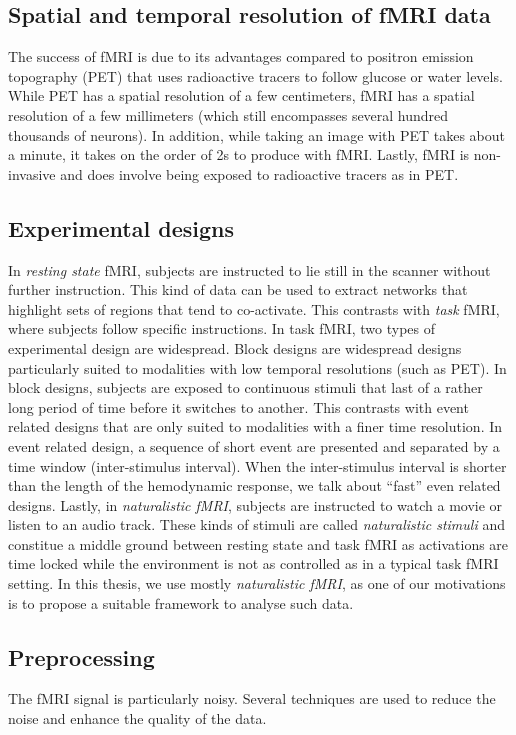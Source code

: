 \subsection{Spatial and temporal resolution of fMRI data}
The success of fMRI is due to its advantages compared to positron
emission topography (PET) that uses radioactive tracers to follow glucose or water levels.
While PET has a spatial resolution of a few
centimeters, fMRI has a spatial resolution of a few millimeters (which still
encompasses several hundred thousands of neurons).
In addition, while taking an image with PET takes about a minute, it takes on
the order of 2s to produce with fMRI.
Lastly, fMRI is non-invasive and does involve being exposed to radioactive tracers as in PET.

\subsection{Experimental designs}
In \emph{resting state} fMRI, subjects are instructed to lie still in the scanner without further instruction.
This kind of data can be used to extract networks that highlight sets of regions that tend to co-activate.
This contrasts with \emph{task} fMRI, where subjects follow specific instructions.
In task fMRI, two types of experimental design are widespread.
Block designs are widespread designs particularly suited to modalities with low temporal resolutions (such as PET). In block designs, subjects are exposed to continuous stimuli that last of a rather long period of time before it switches to another.
This contrasts with event related designs that are only suited to modalities with a finer time resolution. In event related design, a sequence of short event are presented and separated by a time window (inter-stimulus interval).
When the inter-stimulus interval is shorter than the length of the hemodynamic response, we talk about ``fast'' even related designs.
Lastly, in \emph{naturalistic fMRI}, subjects are instructed to watch a movie
or listen to an audio track. These kinds of stimuli are called \emph{naturalistic stimuli} and constitue a middle ground between resting state and task fMRI as activations are time locked while the environment is not as controlled as in a typical task fMRI setting.
%
In this thesis, we use mostly \emph{naturalistic fMRI}, as one of our motivations is to propose a suitable framework to analyse such data.

\subsection{Preprocessing}
The fMRI signal is particularly noisy. Several techniques are used to reduce the noise and enhance the quality of the data.

